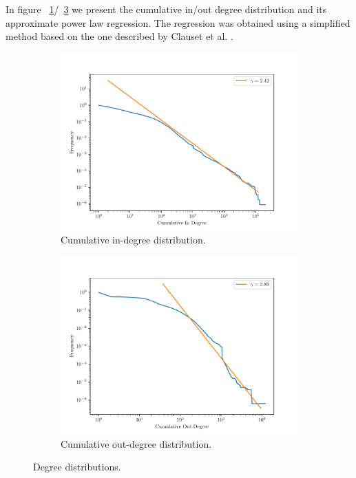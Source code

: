 \documentclass[9pt,a4paper]{article}
\begin{document}
In figure ~\ref{fig:inddist}/~\ref{fig:outddist} we present the cumulative in/out degree distribution and its approximate power law regression. The regression was obtained using a simplified method based on the one described by Clauset et al. \cite{Clauset2009}. 
\begin{figure}[h]
	\centering
	\begin{subfigure}{.5\textwidth}
		\centering
		\includegraphics[width=\linewidth]{wikipedia_pt_in.pdf}
		\caption{Cumulative in-degree distribution.}
		\label{fig:inddist}
	\end{subfigure}%
	\begin{subfigure}{.5\textwidth}
		\centering
		\includegraphics[width=\linewidth]{wikipedia_pt_out.pdf}
		\caption{Cumulative out-degree distribution.}
		\label{fig:outddist}
	\end{subfigure}
	\caption{Degree distributions.}
\end{figure}
\end{document}
